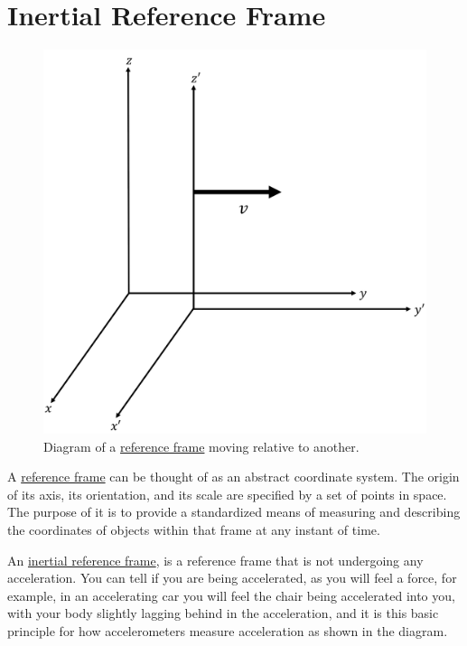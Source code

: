 \section{Inertial Reference Frame}

\begin{figure}[H]
	\centering
	\includegraphics[width=0.35 \textwidth]{images/pdf/Reference Frames.pdf}
	\caption{Diagram of a \protect\hyperlink{def-Reference-frame}{reference frame} moving relative to another.}
	\label{fig: Reference Frames}
\end{figure}

A \hyperlink{def-Reference-frame}{reference frame} can be thought of as an abstract coordinate system. The origin of its axis, its orientation, and its scale are specified by a set of points in space. The purpose of it is to provide a standardized means of measuring and describing the coordinates of objects within that frame at any instant of time.

An \hyperlink{def-Inertial-reference-frame}{inertial reference frame}, is a reference frame that is not undergoing any acceleration. You can tell if you are being accelerated, as you will feel a force, for example, in an accelerating car you will feel the chair being accelerated into you, with your body slightly lagging behind in the acceleration, and it is this basic principle for how accelerometers measure acceleration as shown in the diagram.

